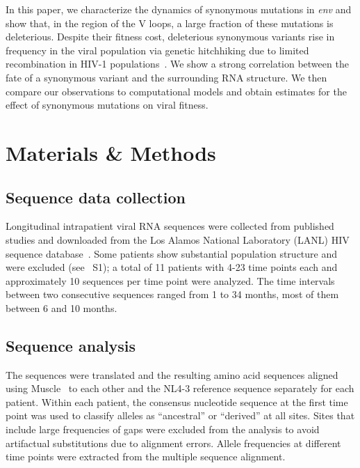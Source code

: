 \documentclass[11pt]{article}
\newcommand{\env}{\textit{env}}
\newcommand{\PCApat}{1}
\begin{document}
In this paper, we characterize the dynamics of synonymous mutations in \env{}
and show that, in the region of the V loops, a large fraction of these mutations
is deleterious. Despite their fitness cost, deleterious synonymous variants
rise in frequency in the viral population via genetic hitchhiking due to limited
recombination in HIV-1 populations~\citep{neher_recombination_2010,
batorsky_estimate_2011}. We show a strong correlation between the fate of a
synonymous variant and the surrounding RNA structure. We then compare our
observations to computational models and obtain estimates for the effect of
synonymous mutations on viral fitness.

\section*{Materials \& Methods}
\subsection*{Sequence data collection}
Longitudinal intrapatient viral RNA sequences were collected from published
studies \citep{shankarappa_consistent_1999, liu_selection_2006,
bunnik_autologous_2008} and downloaded from the Los Alamos National Laboratory
(LANL) HIV sequence database~\citep{LANL2012}. Some patients
show substantial population structure and were excluded (see
\figurename~S\PCApat); a total of 11 patients with 4-23 time points each and
approximately 10 sequences per time point were analyzed. The time intervals
between two consecutive sequences ranged from 1 to 34 months, most of them
between 6 and 10 months.

\subsection*{Sequence analysis}
The sequences were translated and the resulting amino acid sequences aligned
using Muscle~\citep{edgar_muscle:_2004} to each other and the NL4-3 reference
sequence separately for each patient. Within each patient, the consensus
nucleotide sequence at the first time point was used to classify alleles as
``ancestral'' or ``derived'' at all sites. Sites that include large
frequencies of gaps were excluded from the analysis to avoid artifactual
substitutions due to alignment errors. Allele frequencies at different time
points were extracted from the multiple sequence alignment.
\end{document}
